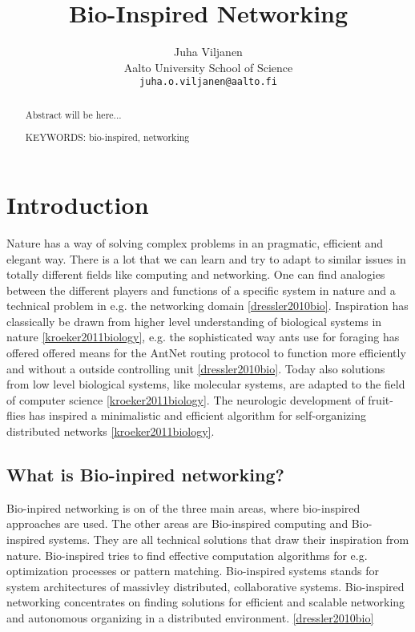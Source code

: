 \documentclass{IWORK2014}
\begin{document}

\title{Bio-Inspired Networking}

\author{Juha Viljanen\\
        Aalto University School of Science \\
	\texttt{juha.o.viljanen@aalto.fi}}
\maketitle


\begin{abstract}
  Abstract will be here...

\vspace{3mm}
\noindent KEYWORDS: bio-inspired, networking

\end{abstract}



\section{Introduction}

Nature has a way of solving complex problems in an pragmatic, efficient and elegant way. There is a lot that we can learn and try to adapt to similar issues in totally different fields like computing and networking. One can find analogies between the different players and functions of a specific system in nature and a technical problem in e.g. the networking domain \ref{dressler2010bio}. Inspiration has classically be drawn from higher level understanding of biological systems in nature \ref{kroeker2011biology}, e.g. the sophisticated way ants use for foraging has offered offered means for the AntNet routing protocol to function more efficiently and without a outside controlling unit \ref{dressler2010bio}. Today also solutions from low level biological systems, like molecular systems, are adapted to the field of computer science \ref{kroeker2011biology}. The neurologic development of fruit-flies has inspired a minimalistic and efficient algorithm for self-organizing distributed networks \ref{kroeker2011biology}.

\subsection{What is Bio-inpired networking?}
Bio-inpired networking is on of the three main areas, where bio-inspired approaches are used. The other areas are Bio-inspired computing and Bio-inspired systems. They are all technical solutions that draw their inspiration from nature. Bio-inspired tries to find effective computation algorithms for e.g. optimization processes or pattern matching. Bio-inspired systems stands for system architectures of massivley distributed, collaborative systems. Bio-inspired networking concentrates on finding solutions for efficient and scalable networking and autonomous organizing in a distributed environment. \ref{dressler2010bio}
\end{document}
